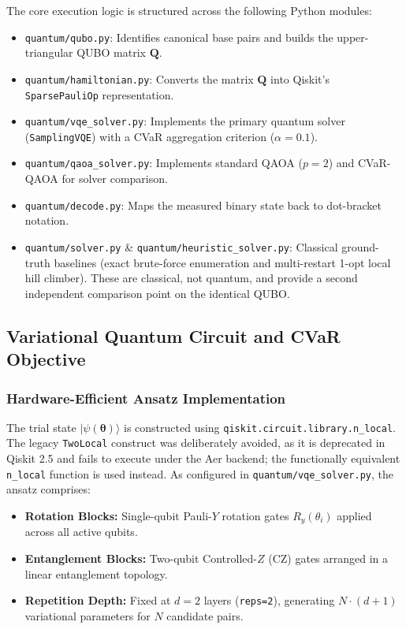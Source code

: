 \documentclass[11pt,a4paper]{article}
\begin{document}
	The core execution logic is structured across the following Python modules:
	\begin{itemize}[leftmargin=1.2cm]
		\item \texttt{quantum/qubo.py}: Identifies canonical base pairs and builds the upper-triangular QUBO matrix $\mathbf{Q}$.
		\item \texttt{quantum/hamiltonian.py}: Converts the matrix $\mathbf{Q}$ into Qiskit's \texttt{SparsePauliOp} representation.
		\item \texttt{quantum/vqe\_solver.py}: Implements the primary quantum solver (\texttt{SamplingVQE}) with a CVaR aggregation criterion ($\alpha = 0.1$).
		\item \texttt{quantum/qaoa\_solver.py}: Implements standard QAOA ($p=2$) and CVaR-QAOA for solver comparison.
		\item \texttt{quantum/decode.py}: Maps the measured binary state back to dot-bracket notation.
		\item \texttt{quantum/solver.py} \& \texttt{quantum/heuristic\_solver.py}: Classical ground-truth baselines (exact brute-force enumeration and multi-restart 1-opt local hill climber). These are classical, not quantum, and provide a second independent comparison point on the identical QUBO.
	\end{itemize}
	
	\subsection{Variational Quantum Circuit and CVaR Objective}
	
	\subsubsection{Hardware-Efficient Ansatz Implementation}
	The trial state $|\psi(\boldsymbol{\theta})\rangle$ is constructed using \texttt{qiskit.circuit.library.n\_local}. The legacy \texttt{TwoLocal} construct was deliberately avoided, as it is deprecated in Qiskit 2.5 and fails to execute under the Aer backend; the functionally equivalent \texttt{n\_local} function is used instead. As configured in \texttt{quantum/vqe\_solver.py}, the ansatz comprises:
	\begin{itemize}[leftmargin=1.2cm]
		\item \textbf{Rotation Blocks:} Single-qubit Pauli-$Y$ rotation gates $R_y(\theta_i)$ applied across all active qubits.
		\item \textbf{Entanglement Blocks:} Two-qubit Controlled-$Z$ ($\text{CZ}$) gates arranged in a linear entanglement topology.
		\item \textbf{Repetition Depth:} Fixed at $d = 2$ layers (\texttt{reps=2}), generating $N \cdot (d + 1)$ variational parameters for $N$ candidate pairs.
	\end{itemize}
	
\end{document}
